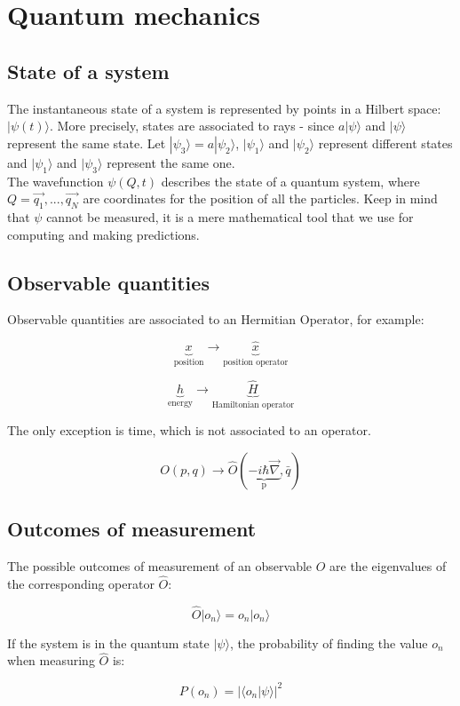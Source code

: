\chapter{Quantum mechanics}

\section{State of a system}
The instantaneous state of a system is represented by points in a Hilbert space: $|\psi(t)\rangle$.
More precisely,  states are associated to rays - since $a|\psi\rangle$ and $|\psi\rangle$ represent the same state.
Let $|\psi_3\rangle = a |\psi_2\rangle$, $|\psi_1\rangle$ and $|\psi_2\rangle$ represent different states and $|\psi_1\rangle$ and $|\psi_3\rangle$ represent the same one.\\
\noindent
The wavefunction $\psi(Q,t)$ describes the state of a quantum system, where $Q=\vec{q_1},...,\vec{q_N}$ are coordinates for the position of all the particles.
Keep in mind that $\psi$ cannot be measured, it is a mere mathematical tool that we use for computing and making predictions.

\section{Observable quantities}
Observable quantities are associated to an Hermitian Operator, for example:

$$\underbrace{x}_{\text{position}}\rightarrow\underbrace{\hat{x}}_{\text{position operator}}$$

$$\underbrace{h}_{\text{energy}}\rightarrow\underbrace{\hat{H}}_{\text{Hamiltonian operator}}$$

The only exception is time, which is not associated to an operator.

$$O(p,q)\rightarrow\hat{O}(\underbrace{-i\hbar\vec{\nabla}}_{\text{p}},\bar{q})$$

\section{Outcomes of measurement}
The possible outcomes of measurement of an observable $O$ are the eigenvalues of the corresponding operator $\hat{O}$:

$$\hat{O}|o_n\rangle = o_n|o_n\rangle$$

If the system is in the quantum state $|\psi\rangle$, the probability of finding the value $o_n$ when measuring $\hat{O}$ is:

$$P(o_n) = |\langle o_n|\psi\rangle|^2$$

